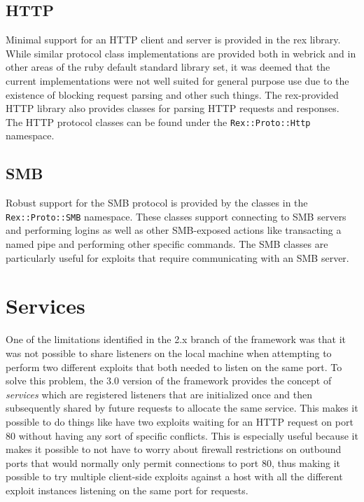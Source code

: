 \documentclass{report}
\begin{document}
        \subsection{HTTP}

\par
Minimal support for an HTTP client and server is provided in the rex
library.  While similar protocol class implementations are provided
both in webrick and in other areas of the ruby default standard
library set, it was deemed that the current implementations were not
well suited for general purpose use due to the existence of blocking
request parsing and other such things.  The rex-provided HTTP
library also provides classes for parsing HTTP requests and
responses.  The HTTP protocol classes can be found under the
\texttt{Rex::Proto::Http} namespace.

        \subsection{SMB}

\par
Robust support for the SMB protocol is provided by the classes in
the \texttt{Rex::Proto::SMB} namespace.  These classes support
connecting to SMB servers and performing logins as well as other
SMB-exposed actions like transacting a named pipe and performing
other specific commands.  The SMB classes are particularly useful
for exploits that require communicating with an SMB server.

    \section{Services}

\par
One of the limitations identified in the 2.x branch of the framework
was that it was not possible to share listeners on the local machine
when attempting to perform two different exploits that both needed
to listen on the same port.  To solve this problem, the 3.0 version
of the framework provides the concept of \textit{services} which are
registered listeners that are initialized once and then subsequently
shared by future requests to allocate the same service.  This makes
it possible to do things like have two exploits waiting for an HTTP
request on port 80 without having any sort of specific conflicts.
This is especially useful because it makes it possible to not have
to worry about firewall restrictions on outbound ports that would
normally only permit connections to port 80, thus making it possible
to try multiple client-side exploits against a host with all the
different exploit instances listening on the same port for requests.
\end{document}
